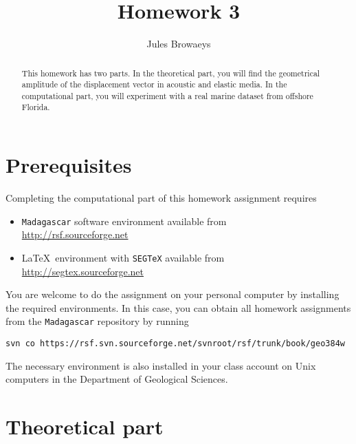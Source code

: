 \author{Jules Browaeys}
\title{Homework 3}

\begin{abstract}
  This homework has two parts. In the theoretical part, you will find
  the geometrical amplitude of the displacement vector in acoustic and
  elastic media. In the computational part, you will experiment with a
  real marine dataset from offshore Florida.
\end{abstract}

\section{Prerequisites}

Completing the computational part of this homework assignment requires
\begin{itemize}
\item \texttt{Madagascar} software environment available from \\
\url{http://rsf.sourceforge.net}
\item \LaTeX\ environment with \texttt{SEGTeX} available from \\ 
\url{http://segtex.sourceforge.net}
\end{itemize}

You are welcome to do the assignment on your personal computer by
installing the required environments. In this case, you can obtain all
homework assignments from the \texttt{Madagascar} repository by running
\begin{verbatim}
svn co https://rsf.svn.sourceforge.net/svnroot/rsf/trunk/book/geo384w 
\end{verbatim}

The necessary environment is also installed in your class account on
Unix computers in the Department of Geological Sciences.

\section{Theoretical part}

